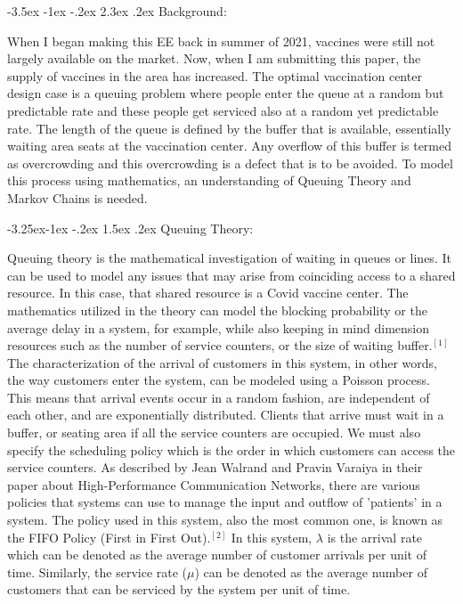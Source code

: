 \documentclass[11pt]{article}
\makeatletter
\renewcommand\section{\@startsection {section}{1}{\z@}%
                                       {-3.5ex \@plus -1ex \@minus -.2ex}%
                                       {2.3ex \@plus.2ex}%
                                       {\normalfont\fontfamily{phv}\fontsize{16}{19}\bfseries}}
\renewcommand\subsection{\@startsection{subsection}{2}{\z@}%
                                         {-3.25ex\@plus -1ex \@minus -.2ex}%
                                         {1.5ex \@plus .2ex}%
                                         {\normalfont\fontfamily{phv}\fontsize{14}{17}\bfseries}}
\makeatother
\begin{document}
\section{Background:} \label{s:sec2}

When I began making this EE back in summer of 2021, vaccines were still not largely available on the market. Now, when I am submitting this paper, the supply of vaccines in the area has increased. The optimal vaccination center design case is a queuing problem where people enter the queue at a random but predictable rate and these people get serviced also at a random yet predictable rate. The length of the queue is defined by the buffer that is available, essentially waiting area seats at the vaccination center. Any overflow of this buffer is termed as overcrowding and this overcrowding is a defect that is to be avoided. To model this process using mathematics, an understanding of Queuing Theory and Markov Chains is needed.



\subsection{Queuing Theory:} 

Queuing theory is the mathematical investigation of waiting in queues or lines. It can be used to model any issues that may arise from coinciding access to a shared resource. In this case, that shared resource is a Covid vaccine center. The mathematics utilized in the theory can model the blocking probability or the average delay in a system, for example, while also keeping in mind dimension resources such as the number of service counters, or the size of waiting buffer.$^{[1]}$ \\
The characterization of the arrival of customers in this system, in other words, the way customers enter the system, can be modeled using a Poisson process. This means that arrival events occur in a random fashion, are independent of each other, and are exponentially distributed. Clients that arrive must wait in a buffer, or seating area if all the service counters are occupied. We must also specify the scheduling policy which is the order in which customers can access the service counters. As described by Jean Walrand and Pravin Varaiya in their paper about High-Performance Communication Networks, there are various policies that systems can use to manage the input and outflow of 'patients' in a system. The policy used in this system, also the most common one, is known as the FIFO Policy (First in First Out).$^{[2]}$ In this system, $\lambda$ is the arrival rate which can be denoted as the average number of customer arrivals per unit of time. Similarly, the service rate ($\mu$) can be denoted as the average number of customers that can be serviced by the system per unit of time.
\end{document}
